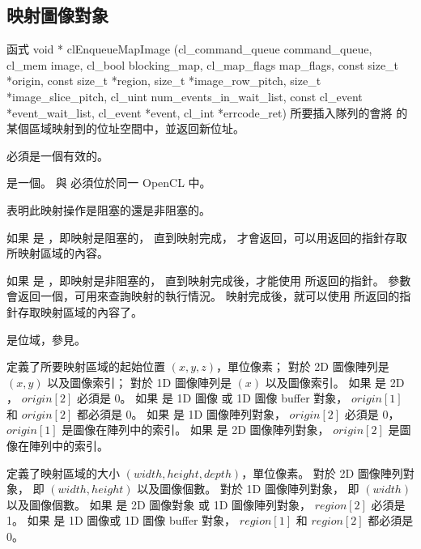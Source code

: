 \subsection{映射圖像對象}

函式
\startCLFUNC
void * clEnqueueMapImage (cl_command_queue command_queue,
			cl_mem image,
			cl_bool blocking_map,
			cl_map_flags map_flags,
			const size_t *origin,
			const size_t *region,
			size_t *image_row_pitch,
			size_t *image_slice_pitch,
			cl_uint num_events_in_wait_list,
			const cl_event *event_wait_list,
			cl_event *event,
			cl_int *errcode_ret)
\stopCLFUNC
所要插入隊列的會將  的某個區域映射到的位址空間中，並返回新位址。

 必須是一個有效的。

 是一個。
 與  必須位於同一 OpenCL 中。

 表明此映射操作是{\ftRef 阻塞的}還是{\ftRef 非阻塞的}。

如果  是 ，即映射是阻塞的，
直到映射完成，  才會返回，可以用返回的指針存取所映射區域的內容。

如果  是 ，即映射是非阻塞的，
直到映射完成後，才能使用  所返回的指針。
參數  會返回一個，可用來查詢映射的執行情況。
映射完成後，就可以使用  所返回的指針存取映射區域的內容了。

 是位域，參見。

 定義了所要映射區域的起始位置 $(x, y, z)$，單位像素；
對於 2D 圖像陣列是 $(x, y)$ 以及圖像索引；
對於 1D 圖像陣列是 $(x)$ 以及圖像索引。
如果  是 2D ， $origin[2]$ 必須是 0。
如果  是 1D 圖像 或 1D 圖像 buffer 對象， $origin[1]$ 和 $origin[2]$ 都必須是 0。
如果  是 1D 圖像陣列對象， $origin[2]$ 必須是 0， $origin[1]$ 是圖像在陣列中的索引。
如果  是 2D 圖像陣列對象， $origin[2]$ 是圖像在陣列中的索引。

 定義了映射區域的大小 $(width, height, depth)$，單位像素。
對於 2D 圖像陣列對象， 即 $(width, height)$ 以及圖像個數。
對於 1D 圖像陣列對象， 即 $(width)$ 以及圖像個數。
如果  是 2D 圖像對象 或 1D 圖像陣列對象， $region[2]$ 必須是 1。
如果  是 1D 圖像或 1D 圖像 buffer 對象， $region[1]$ 和 $region[2]$ 都必須是 0。

